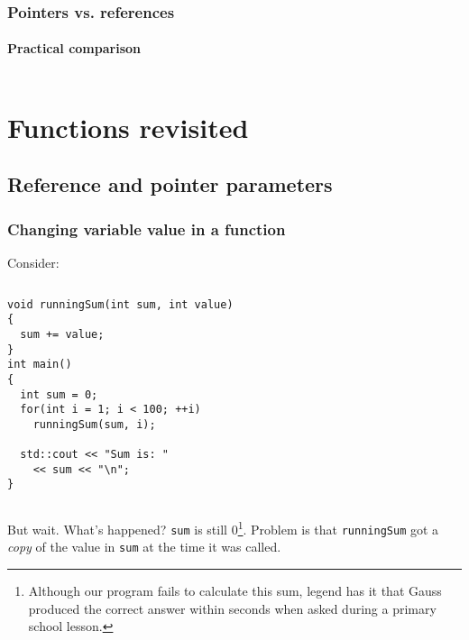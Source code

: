 \documentclass{beamer}
\begin{document}
\begin{frame}
  \frametitle{Pointers vs. references}
  \framesubtitle{Practical comparison}
  
  	\begin{columns}[t]
  	  \begin{column}[T]{0.5\textwidth}

			\end{column}
  	  \begin{column}[T]{0.5\textwidth}
  	    
  	  \end{column}
  	\end{columns}
  
\end{frame}

\section{Functions revisited}

\subsection{Reference and pointer parameters}


\begin{frame}[fragile]
  \frametitle{Changing variable value in a function}
  Consider:
  \begin{columns}[t]
    \begin{column}[T]{0.6\textwidth}
	    \begin{lstlisting}[aboveskip=0pt]
void runningSum(int sum, int value)
{
  sum += value;
}
int main()
{
  int sum = 0;
  for(int i = 1; i < 100; ++i)
    runningSum(sum, i);
    
  std::cout << "Sum is: "
    << sum << "\n";
}
      \end{lstlisting}
    \end{column}
    \begin{column}[T]{0.4\textwidth}
    \end{column}
  \end{columns}
  But wait.  What's happened? \texttt{sum} is still 0\footnote{Although our program fails to calculate this sum, legend has it that Gauss produced the correct answer within seconds when asked during a primary school lesson.}.
  \newline\pause
  Problem is that \texttt{runningSum} got a \textit{copy} of the value in \texttt{sum} at the time it was called.

\end{frame}
\end{document}
